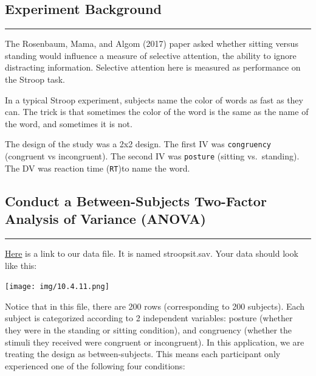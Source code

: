 \documentclass[
]{book}
\begin{document}
\hypertarget{experiment-background-7}{%
\subsection{Experiment Background}\label{experiment-background-7}}

\begin{center}\rule{0.5\linewidth}{0.5pt}\end{center}

The Rosenbaum, Mama, and Algom (2017) paper asked whether sitting versus standing would influence a measure of selective attention, the ability to ignore distracting information. Selective attention here is measured as performance on the Stroop task.

In a typical Stroop experiment, subjects name the color of words as fast as they can. The trick is that sometimes the color of the word is the same as the name of the word, and sometimes it is not.

The design of the study was a 2x2 design. The first IV was \texttt{congruency} (congruent vs incongruent). The second IV was \texttt{posture} (sitting vs.~standing). The DV was reaction time (\texttt{RT})to name the word.

\hypertarget{conduct-a-between-subjects-two-factor-analysis-of-variance-anova}{%
\subsection{Conduct a Between-Subjects Two-Factor Analysis of Variance (ANOVA)}\label{conduct-a-between-subjects-two-factor-analysis-of-variance-anova}}

\begin{center}\rule{0.5\linewidth}{0.5pt}\end{center}

\href{https://github.com/CrumpLab/statisticsLab/blob/master/data/spssdata/stroopsit.sav}{Here} is a link to our data file. It is named stroopsit.sav. Your data should look like this:

\texttt{[image: img/10.4.11.png]}

Notice that in this file, there are 200 rows (corresponding to 200 subjects). Each subject is categorized according to 2 independent variables: posture (whether they were in the standing or sitting condition), and congruency (whether the stimuli they received were congruent or incongruent). In this application, we are treating the design as between-subjects. This means each participant only experienced one of the following four conditions:
\end{document}
